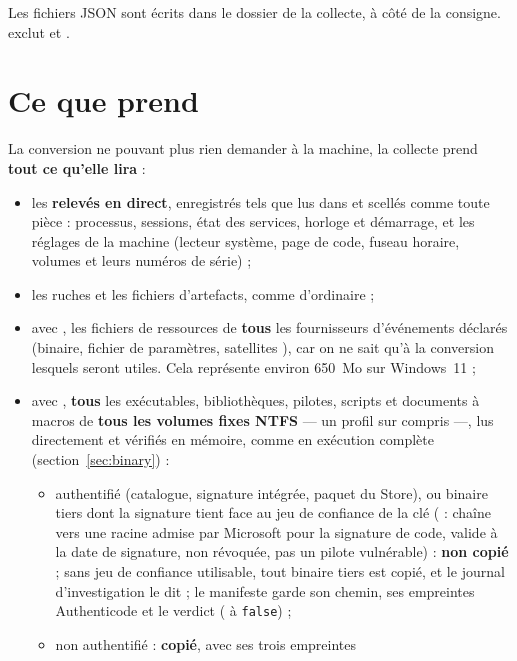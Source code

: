 \documentclass[11pt,a4paper,oneside]{report}
\begin{document}
Les fichiers JSON sont écrits dans le dossier de la collecte, à côté de la
consigne.  exclut  et .

\section{Ce que prend }

La conversion ne pouvant plus rien demander à la machine, la collecte prend
\textbf{tout ce qu'elle lira} :
\begin{itemize}
  \item les \textbf{relevés en direct}, enregistrés tels que lus dans
         et scellés comme toute pièce :
        processus, sessions, état des services, horloge et démarrage, et les
        réglages de la machine (lecteur système, page de code, fuseau horaire,
        volumes et leurs numéros de série) ;
  \item les ruches et les fichiers d'artefacts, comme d'ordinaire ;
  \item avec , les fichiers de ressources de \textbf{tous} les
        fournisseurs d'événements déclarés (binaire, fichier de paramètres,
        satellites ), car on ne sait qu'à la conversion lesquels
        seront utiles. Cela représente environ 650~Mo sur Windows~11 ;
  \item avec , \textbf{tous} les exécutables, bibliothèques,
        pilotes, scripts et documents à macros de \textbf{tous les volumes fixes
        NTFS} — un profil sur  compris —, lus directement et
        vérifiés en mémoire, comme en exécution complète (section~\ref{sec:binary}) :
        \begin{itemize}
          \item authentifié (catalogue, signature intégrée, paquet du Store), ou
                binaire tiers dont la signature tient face au jeu de confiance de
                la clé ( : chaîne vers une racine admise par
                Microsoft pour la signature de code, valide à la date de
                signature, non révoquée, pas un pilote vulnérable) :
                \textbf{non copié} ; sans jeu de confiance utilisable, tout
                binaire tiers est copié, et le journal d'investigation le dit ; le manifeste garde son chemin, ses empreintes
                Authenticode et le verdict ( à \texttt{false}) ;
          \item non authentifié : \textbf{copié}, avec ses trois empreintes

\end{itemize}
\end{itemize}
\end{document}
